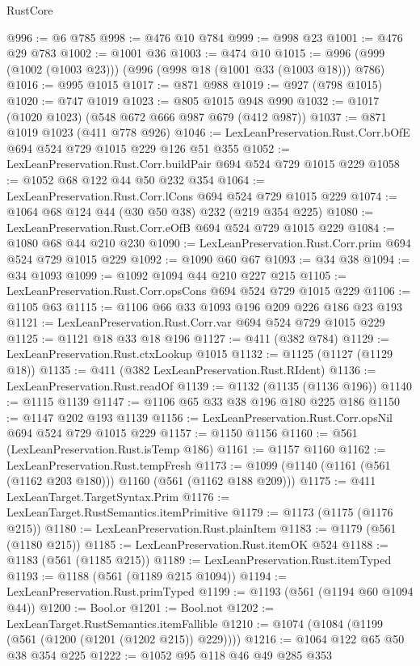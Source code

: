 \begin{lexlean}{RustCore}
\begin{coremodule}
@996 := @6 @785
@998 := @476 @10 @784
@999 := @998 @23
@1001 := @476 @29 @783
@1002 := @1001 @36
@1003 := @474 @10
@1015 := @996 (@999 (@1002 (@1003 @23))) (@996 (@998 @18 (@1001 @33 (@1003 @18))) @786)
@1016 := @995 @1015
@1017 := @871 @988
@1019 := @927 (@798 @1015)
@1020 := @747 @1019
@1023 := @805 @1015 @948 @990
@1032 := @1017 (@1020 @1023) (@548 @672 @666 @987 @679 (@412 @987))
@1037 := @871 @1019 @1023 (@411 @778 @926)
@1046 := LexLeanPreservation.Rust.Corr.bOfE @694 @524 @729 @1015 @229 @126 @51 @355
@1052 := LexLeanPreservation.Rust.Corr.buildPair @694 @524 @729 @1015 @229
@1058 := @1052 @68 @122 @44 @50 @232 @354
@1064 := LexLeanPreservation.Rust.Corr.lCons @694 @524 @729 @1015 @229
@1074 := @1064 @68 @124 @44 (@30 @50 @38) @232 (@219 @354 @225)
@1080 := LexLeanPreservation.Rust.Corr.eOfB @694 @524 @729 @1015 @229
@1084 := @1080 @68 @44 @210 @230
@1090 := LexLeanPreservation.Rust.Corr.prim @694 @524 @729 @1015 @229
@1092 := @1090 @60 @67
@1093 := @34 @38
@1094 := @34 @1093
@1099 := @1092 @1094 @44 @210 @227 @215
@1105 := LexLeanPreservation.Rust.Corr.opsCons @694 @524 @729 @1015 @229
@1106 := @1105 @63
@1115 := @1106 @66 @33 @1093 @196 @209 @226 @186 @23 @193
@1121 := LexLeanPreservation.Rust.Corr.var @694 @524 @729 @1015 @229
@1125 := @1121 @18 @33 @18 @196
@1127 := @411 (@382 @784)
@1129 := LexLeanPreservation.Rust.ctxLookup @1015
@1132 := @1125 (@1127 (@1129 @18))
@1135 := @411 (@382 LexLeanPreservation.Rust.RIdent)
@1136 := LexLeanPreservation.Rust.readOf
@1139 := @1132 (@1135 (@1136 @196))
@1140 := @1115 @1139
@1147 := @1106 @65 @33 @38 @196 @180 @225 @186
@1150 := @1147 @202 @193 @1139
@1156 := LexLeanPreservation.Rust.Corr.opsNil @694 @524 @729 @1015 @229
@1157 := @1150 @1156
@1160 := @561 (LexLeanPreservation.Rust.isTemp @186)
@1161 := @1157 @1160
@1162 := LexLeanPreservation.Rust.tempFresh
@1173 := @1099 (@1140 (@1161 (@561 (@1162 @203 @180))) @1160 (@561 (@1162 @188 @209)))
@1175 := @411 LexLeanTarget.TargetSyntax.Prim
@1176 := LexLeanTarget.RustSemantics.itemPrimitive
@1179 := @1173 (@1175 (@1176 @215))
@1180 := LexLeanPreservation.Rust.plainItem
@1183 := @1179 (@561 (@1180 @215))
@1185 := LexLeanPreservation.Rust.itemOK @524
@1188 := @1183 (@561 (@1185 @215))
@1189 := LexLeanPreservation.Rust.itemTyped
@1193 := @1188 (@561 (@1189 @215 @1094))
@1194 := LexLeanPreservation.Rust.primTyped
@1199 := @1193 (@561 (@1194 @60 @1094 @44))
@1200 := Bool.or
@1201 := Bool.not
@1202 := LexLeanTarget.RustSemantics.itemFallible
@1210 := @1074 (@1084 (@1199 (@561 (@1200 (@1201 (@1202 @215)) @229))))
@1216 := @1064 @122 @65 @50 @38 @354 @225
@1222 := @1052 @95 @118 @46 @49 @285 @353

\end{coremodule}
\end{lexlean}
